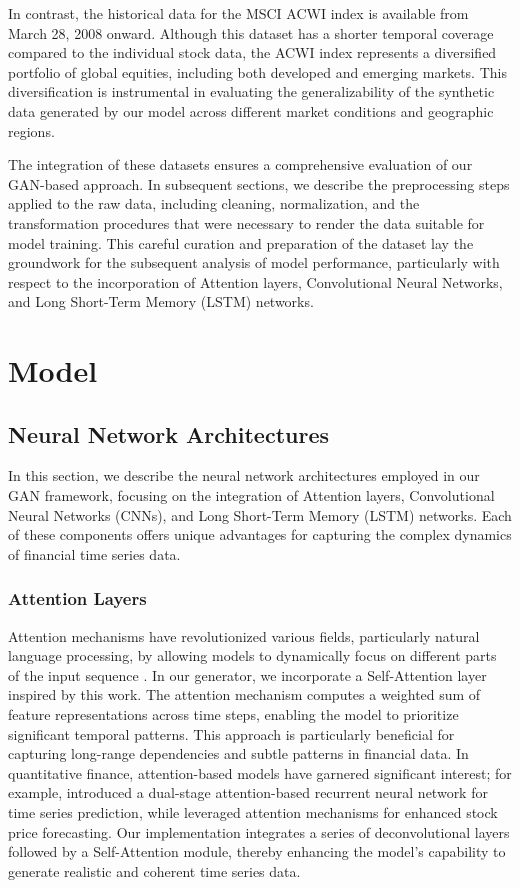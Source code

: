 \documentclass{article}
\begin{document}
In contrast, the historical data for the MSCI ACWI index is available from March 28, 2008 onward. Although this dataset has a shorter temporal coverage compared to the individual stock data, the ACWI index represents a diversified portfolio of global equities, including both developed and emerging markets. This diversification is instrumental in evaluating the generalizability of the synthetic data generated by our model across different market conditions and geographic regions.

The integration of these datasets ensures a comprehensive evaluation of our GAN-based approach. In subsequent sections, we describe the preprocessing steps applied to the raw data, including cleaning, normalization, and the transformation procedures that were necessary to render the data suitable for model training. This careful curation and preparation of the dataset lay the groundwork for the subsequent analysis of model performance, particularly with respect to the incorporation of Attention layers, Convolutional Neural Networks, and Long Short-Term Memory (LSTM) networks.

\section{Model}

\subsection{Neural Network Architectures}

In this section, we describe the neural network architectures employed in our GAN framework, focusing on the integration of Attention layers, Convolutional Neural Networks (CNNs), and Long Short-Term Memory (LSTM) networks. Each of these components offers unique advantages for capturing the complex dynamics of financial time series data.

\subsubsection{Attention Layers}

Attention mechanisms have revolutionized various fields, particularly natural language processing, by allowing models to dynamically focus on different parts of the input sequence \textcite{vaswani_attention_2023}. In our generator, we incorporate a Self-Attention layer inspired by this work. The attention mechanism computes a weighted sum of feature representations across time steps, enabling the model to prioritize significant temporal patterns. This approach is particularly beneficial for capturing long-range dependencies and subtle patterns in financial data. In quantitative finance, attention-based models have garnered significant interest; for example, \textcite{qin_dual-stage_2017} introduced a dual-stage attention-based recurrent neural network for time series prediction, while \textcite{chen_exploring_2019} leveraged attention mechanisms for enhanced stock price forecasting. Our implementation integrates a series of deconvolutional layers followed by a Self-Attention module, thereby enhancing the model's capability to generate realistic and coherent time series data.
\end{document}
